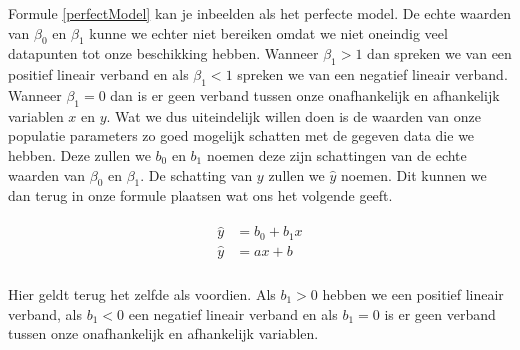 \documentclass[11pt]{report}
\newcommand{\pbr}{\hfill\break\hfill\break}
\newcommand{\lbr}{\hfill\break}
\begin{document}
\pbr
Formule \ref{perfectModel} kan je inbeelden als het perfecte model. De echte waarden van $\beta_0$ en $\beta_1$ kunne we echter niet bereiken omdat we niet oneindig veel datapunten tot onze beschikking hebben.\lbr
Wanneer $\beta_1 > 1$ dan spreken we van een positief lineair verband en als $\beta_1 < 1$ spreken we van een negatief lineair verband. Wanneer $\beta_1 = 0$ dan is er geen verband tussen onze onafhankelijk en afhankelijk variablen $x$ en $y$.
\pbr
Wat we dus uiteindelijk willen doen is de waarden van onze populatie parameters zo goed mogelijk schatten met de gegeven data die we hebben. Deze zullen we $b_0$ en $b_1$ noemen deze zijn schattingen van de echte waarden van $\beta_0$ en $\beta_1$. De schatting van $y$ zullen we $\hat{y}$ noemen. Dit kunnen we dan terug in onze formule plaatsen wat ons het volgende geeft.
\begin{ceqn}
  \begin{align}
    \begin{split}
      \hat{y} &= b_0 + b_1x\\
      \hat{y} &= ax + b\\
    \end{split}
    \label{yhatModel}
  \end{align}
\end{ceqn}
Hier geldt terug het zelfde als voordien. Als $b_1 > 0$ hebben we een positief lineair verband, als $b_1 < 0$ een negatief lineair verband en als $b_1 = 0$ is er geen verband tussen onze onafhankelijk en afhankelijk variablen.

\newpage
\end{document}
